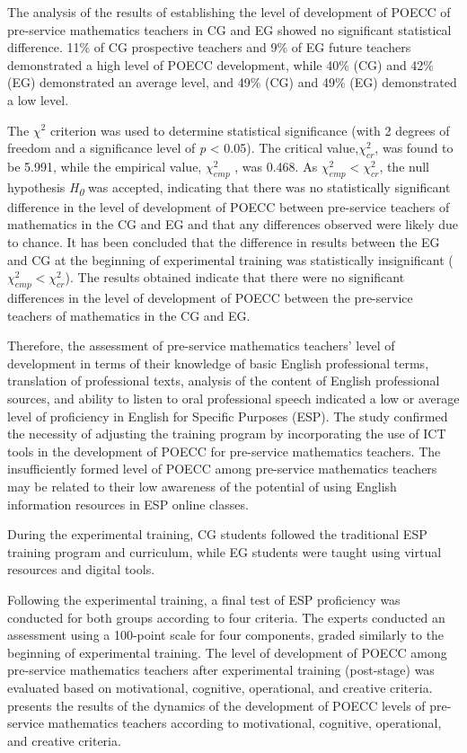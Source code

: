 The analysis of the results of establishing the level of development of
POECC of pre-service mathematics teachers in CG and EG showed no
significant statistical difference. 11\% of CG prospective teachers and
9\% of EG future teachers demonstrated a high level of POECC
development, while 40\% (CG) and 42\% (EG) demonstrated an average
level, and 49\% (CG) and 49\% (EG) demonstrated a low level.

The $\chi^2$ criterion was used to determine statistical significance (with 2
degrees of freedom and a significance level of \emph{p} \textless{}
0.05). The critical value,$\chi^2_{cr}$, was found to be 5.991, while the empirical
value, $\chi^2_{emp}$ , was 0.468. As $\chi^2_{emp} < \chi^2_{cr}$, the null hypothesis
\emph{H}\textsubscript{\emph{0}} was accepted, indicating that there was
no statistically significant difference in the level of development of
POECC between pre-service teachers of mathematics in the CG and EG and
that any differences observed were likely due to chance. It has been
concluded that the difference in results between the EG and CG at the
beginning of experimental training was statistically insignificant ($\chi^2_{emp} < \chi^2_{cr}$). 
The results obtained indicate that there were no
significant differences in the level of development of POECC between the
pre-service teachers of mathematics in the CG and EG.

Therefore, the assessment of pre-service mathematics teachers' level of
development in terms of their knowledge of basic English professional
terms, translation of professional texts, analysis of the content of
English professional sources, and ability to listen to oral professional
speech indicated a low or average level of proficiency in English for
Specific Purposes (ESP). The study confirmed the necessity of adjusting
the training program by incorporating the use of ICT tools in the
development of POECC for pre-service mathematics teachers. The
insufficiently formed level of POECC among pre-service mathematics
teachers may be related to their low awareness of the potential of using
English information resources in ESP online classes.

During the experimental training, CG students followed the traditional
ESP training program and curriculum, while EG students were taught using
virtual resources and digital tools.

Following the experimental training, a final test of ESP proficiency was
conducted for both groups according to four criteria. The experts
conducted an assessment using a 100-point scale for four components,
graded similarly to the beginning of experimental training. The level of
development of POECC among pre-service mathematics teachers after
experimental training (post-stage) was evaluated based on motivational,
cognitive, operational, and creative criteria.  presents the
results of the dynamics of the development of POECC levels of
pre-service mathematics teachers according to motivational, cognitive,
operational, and creative criteria.

